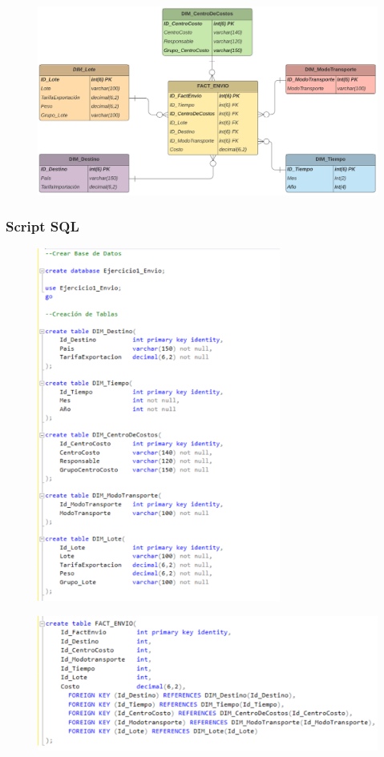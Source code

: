 \documentclass[12pt,letterpaper]{article}
\begin{document}
	\begin{figure}[htb]
		\begin{center}
			\includegraphics[width=14.5cm]{./Imagenes/mod_dimensional_1}
		\end{center}
	\end{figure}


\newpage

\subsubsection{\textbf{Script SQL }}

	\begin{figure}[htb]
		\begin{center}
			\includegraphics[width=8cm]{./Imagenes/Ejercicio1_script1}


		\end{center}
	\end{figure}

	\begin{figure}[htb]
		\begin{center}
			\includegraphics[width=12cm]{./Imagenes/Ejercicio1_script2}

		\end{center}
	\end{figure}
\end{document}
